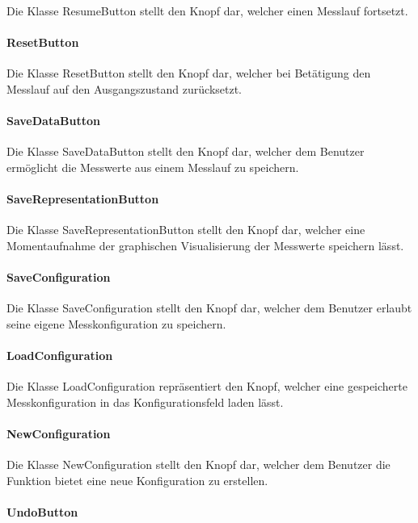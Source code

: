 \documentclass[parskip=full]{scrartcl}
\begin{document}
Die Klasse ResumeButton stellt den Knopf dar, welcher einen Messlauf fortsetzt.

\paragraph{ResetButton}

Die Klasse ResetButton stellt den Knopf dar, welcher bei Betätigung den Messlauf auf den Ausgangszustand zurücksetzt.

\paragraph{SaveDataButton}

Die Klasse SaveDataButton stellt den Knopf dar, welcher dem Benutzer ermöglicht die Messwerte aus einem Messlauf zu speichern.

\paragraph{SaveRepresentationButton}

Die Klasse SaveRepresentationButton stellt den Knopf dar, welcher eine Momentaufnahme der graphischen Visualisierung der Messwerte speichern lässt.

\paragraph{SaveConfiguration}

Die Klasse SaveConfiguration stellt den Knopf dar, welcher dem Benutzer erlaubt seine eigene Messkonfiguration zu speichern.

\paragraph{LoadConfiguration} 

Die Klasse LoadConfiguration repräsentiert den Knopf, welcher eine gespeicherte Messkonfiguration in das Konfigurationsfeld laden lässt.

\paragraph{NewConfiguration}

Die Klasse NewConfiguration stellt den Knopf dar, welcher dem Benutzer die Funktion bietet eine neue Konfiguration zu erstellen.

\paragraph{UndoButton}
\end{document}
